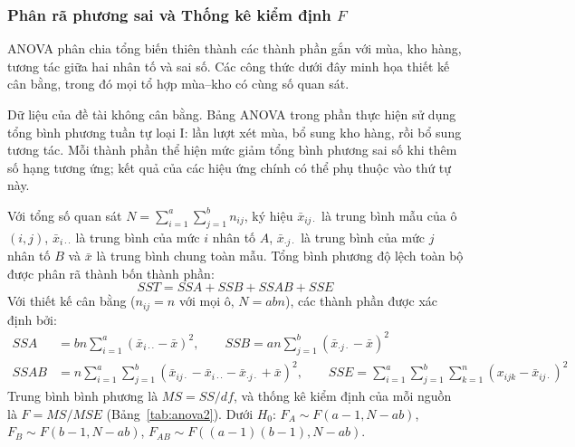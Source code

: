 	
	\subsubsection{Phân rã phương sai và Thống kê kiểm định \texorpdfstring{$F$}{F}}
	
	ANOVA phân chia tổng biến thiên thành các thành phần gắn với mùa, kho hàng, tương tác giữa hai nhân tố và sai số. Các công thức dưới đây minh họa thiết kế cân bằng, trong đó mọi tổ hợp mùa--kho có cùng số quan sát.
	
	Dữ liệu của đề tài không cân bằng. Bảng ANOVA trong phần thực hiện sử dụng tổng bình phương tuần tự loại I: lần lượt xét mùa, bổ sung kho hàng, rồi bổ sung tương tác. Mỗi thành phần thể hiện mức giảm tổng bình phương sai số khi thêm số hạng tương ứng; kết quả của các hiệu ứng chính có thể phụ thuộc vào thứ tự này.
	
	Với tổng số quan sát $N = \sum_{i=1}^{a}\sum_{j=1}^{b} n_{ij}$, ký hiệu $\bar{x}_{ij\cdot}$ là trung bình mẫu của ô $(i, j)$, $\bar{x}_{i\cdot\cdot}$ là trung bình của mức $i$ nhân tố $A$, $\bar{x}_{\cdot j \cdot}$ là trung bình của mức $j$ nhân tố $B$ và $\bar{x}$ là trung bình chung toàn mẫu. Tổng bình phương độ lệch toàn bộ được phân rã thành bốn thành phần:
	\begin{equation}
		SST = SSA + SSB + SSAB + SSE
	\end{equation}
	Với thiết kế cân bằng ($n_{ij} = n$ với mọi ô, $N = abn$), các thành phần được xác định bởi:
	\begin{align}
		SSA &= bn \sum_{i=1}^{a} (\bar{x}_{i\cdot\cdot} - \bar{x})^2, \qquad SSB = an \sum_{j=1}^{b} (\bar{x}_{\cdot j\cdot} - \bar{x})^2 \\
		SSAB &= n \sum_{i=1}^{a} \sum_{j=1}^{b} (\bar{x}_{ij\cdot} - \bar{x}_{i\cdot\cdot} - \bar{x}_{\cdot j\cdot} + \bar{x})^2, \qquad SSE = \sum_{i=1}^{a} \sum_{j=1}^{b} \sum_{k=1}^{n} (x_{ijk} - \bar{x}_{ij\cdot})^2
	\end{align}
	Trung bình bình phương là $MS = SS/df$, và thống kê kiểm định của mỗi nguồn là $F = MS/MSE$ (Bảng~\ref{tab:anova2}). Dưới $H_0$: $F_A \sim F(a-1, N-ab)$, $F_B \sim F(b-1, N-ab)$, $F_{AB} \sim F((a-1)(b-1), N-ab)$.
	
